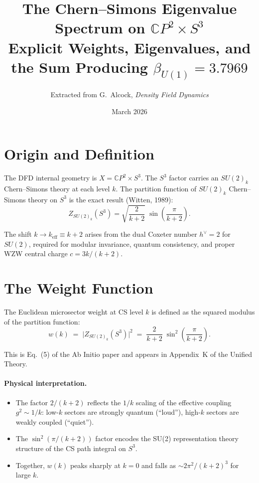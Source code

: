 \documentclass[12pt,a4paper]{article}
\title{The Chern--Simons Eigenvalue Spectrum on $\mathbb{C}P^2 \times S^3$\\[6pt]
\large Explicit Weights, Eigenvalues, and the Sum Producing
$\beta_{U(1)} = 3.7969$}
\author{Extracted from G.\ Alcock, \textit{Density Field Dynamics}}
\date{March 2026}
\begin{document}
\maketitle

\section{Origin and Definition}
\label{sec:origin}

The DFD internal geometry is $X = \mathbb{C}P^2 \times S^3$.  The $S^3$
factor carries an $SU(2)_k$ Chern--Simons theory at each level $k$.
The partition function of $SU(2)_k$ Chern--Simons theory on $S^3$ is the
exact result (Witten, 1989):
\begin{equation}
\label{eq:ZCS}
Z_{SU(2)_k}(S^3) = \sqrt{\frac{2}{k+2}}\;\sin\!\left(\frac{\pi}{k+2}\right).
\end{equation}

The shift $k \to k_{\mathrm{eff}} \equiv k + 2$ arises from the dual Coxeter
number $h^\vee = 2$ for $SU(2)$, required for modular invariance, quantum
consistency, and proper WZW central charge $c = 3k/(k+2)$.

\section{The Weight Function}
\label{sec:weights}

The Euclidean microsector weight at CS level $k$ is defined as the
squared modulus of the partition function:
\begin{equation}
\label{eq:weight}
\boxed{
w(k) \;=\; \bigl|Z_{SU(2)_k}(S^3)\bigr|^2
     \;=\; \frac{2}{k+2}\;\sin^2\!\left(\frac{\pi}{k+2}\right).
}
\end{equation}

This is Eq.~(5) of the Ab Initio paper and appears in Appendix~K of the
Unified Theory.

\paragraph{Physical interpretation.}
\begin{itemize}
\item The factor $2/(k+2)$ reflects the $1/k$ scaling of the effective
  coupling $g^2 \sim 1/k$: low-$k$ sectors are strongly quantum (``loud''),
  high-$k$ sectors are weakly coupled (``quiet'').
\item The $\sin^2(\pi/(k+2))$ factor encodes the SU(2) representation
  theory structure of the CS path integral on $S^3$.
\item Together, $w(k)$ peaks sharply at $k = 0$ and falls as
  $\sim 2\pi^2/(k+2)^3$ for large $k$.
\end{itemize}
\end{document}
